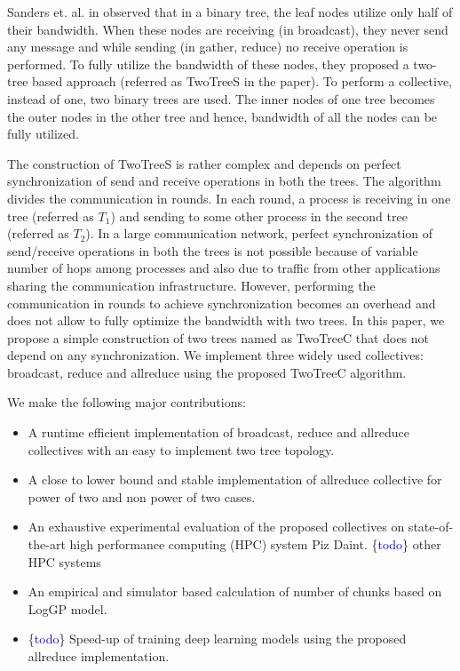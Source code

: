 \documentclass[sigplan,review,anonymous]{acmart}\settopmatter{printfolios=true,printccs=false,printacmref=false}
\begin{document}
Sanders et. al. in \cite{sanders_two-tree_2009} observed that in a binary tree, the leaf nodes utilize only half of their bandwidth. When these nodes are receiving (in broadcast), they never send any message and while sending (in gather, reduce) no receive operation is performed. To fully utilize the bandwidth of these nodes, they proposed a two-tree based approach (referred as TwoTreeS in the paper). To perform a collective, instead of one, two binary trees are used. The inner nodes of one tree becomes the outer nodes in the other tree and hence, bandwidth of all the nodes can be fully utilized. 

The construction of TwoTreeS is rather complex and depends on perfect synchronization of send and receive operations in both the trees. The algorithm divides the communication in rounds. In each round, a process is receiving in one tree (referred as $T_1$) and sending to some other process in the second tree (referred as $T_2$). In a large communication network, perfect synchronization of send/receive operations in both the trees is not possible because of variable number of hops among processes and also due to traffic from other applications sharing the communication infrastructure. However, performing the communication in rounds to achieve synchronization becomes an overhead and does not allow to fully optimize the bandwidth with two trees. In this paper, we propose a simple construction of two trees named as TwoTreeC that does not depend on any synchronization. We implement three widely used collectives: broadcast, reduce and allreduce using the proposed TwoTreeC algorithm. 

We make the following major contributions:

\begin{itemize}
\item A runtime efficient implementation of broadcast, reduce and allreduce collectives with an easy to implement two tree topology.
\item A close to lower bound and stable implementation of allreduce collective for power of two and non power of two cases.
\item An exhaustive experimental evaluation of the proposed collectives on state-of-the-art high performance computing (HPC) system Piz Daint. \ifcmts \{\textcolor{blue}{todo}\} other HPC systems \fi
\item An empirical and simulator based calculation of number of chunks based on LogGP \cite{alexandrov_loggp:_1995} model.
\ifcmts \item \{\textcolor{blue}{todo}\} Speed-up of training deep learning models using the proposed allreduce implementation. \fi
\end{itemize}
\end{document}
